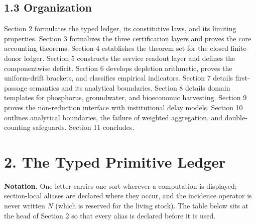 \documentclass[11pt]{article}
\begin{document}
\subsection*{1.3 Organization}\label{13-organization}

Section 2 formulates the typed ledger, its constitutive laws, and its limiting properties. Section 3 formalizes the three certification layers and proves the core accounting theorems. Section 4 establishes the theorem set for the closed finite-donor ledger. Section 5 constructs the service readout layer and defines the componentwise deficit. Section 6 develops depletion arithmetic, proves the uniform-drift brackets, and classifies empirical indicators. Section 7 details first-passage semantics and its analytical boundaries. Section 8 details domain templates for phosphorus, groundwater, and bioeconomic harvesting. Section 9 proves the non-reduction interface with institutional delay models. Section 10 outlines analytical boundaries, the failure of weighted aggregation, and double-counting safeguards. Section 11 concludes.

\vspace{0.8em}

\section*{2. The Typed Primitive Ledger}\label{2-the-typed-primitive-ledger}

\textbf{Notation.} One letter carries one sort wherever a computation is displayed; section-local aliases are declared where they occur, and the incidence operator is never written \(N\) (which is reserved for the living stock). The table below sits at the head of Section 2 so that every alias is declared before it is used.
\end{document}
